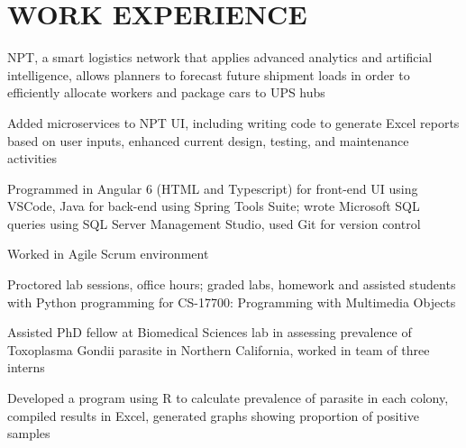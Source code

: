 \documentclass[]{deedy-resume-openfont}
\begin{document}
\hfill
\begin{minipage}[t]{0.67\textwidth} 


\section{WORK EXPERIENCE}

\vspace{\topsep} %
\begin{tightemize}
\item NPT, a smart logistics network that applies advanced analytics and artificial intelligence, allows planners to forecast future shipment loads in order to efficiently allocate workers and package cars to UPS hubs
\item Added microservices to NPT UI, including writing code to generate Excel reports based on user inputs, enhanced current design, testing, and maintenance activities
\item Programmed in Angular 6 (HTML and Typescript) for front-end UI using VSCode, Java for back-end using Spring Tools Suite; wrote Microsoft SQL queries using SQL Server Management Studio, used Git for version control
\item Worked in Agile Scrum environment
\end{tightemize}
\sectionsep

\vspace{\topsep} %
\begin{tightemize}
\item Proctored lab sessions, office hours; graded labs, homework and assisted students with Python programming for CS-17700: Programming with Multimedia Objects
\end{tightemize}
\sectionsep

\vspace{\topsep} %
\begin{tightemize}
\item Assisted PhD fellow at Biomedical Sciences lab in assessing prevalence of Toxoplasma Gondii parasite in Northern California, worked in team of three interns
\item Developed a program using R to calculate prevalence of parasite in each colony, compiled results in Excel, generated graphs showing proportion of positive samples
\end{tightemize}
\sectionsep


\end{minipage}
\end{document}
